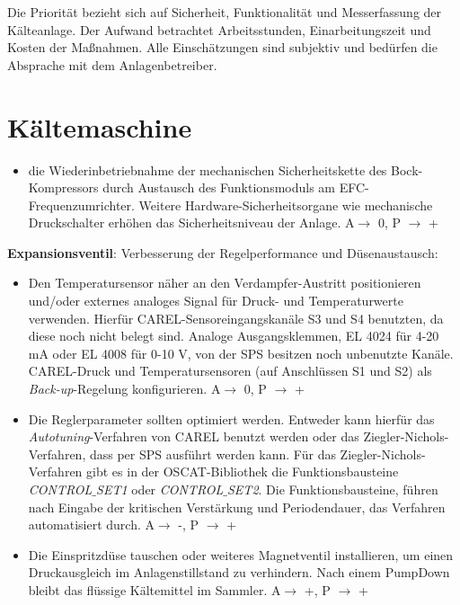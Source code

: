 Die Priorität bezieht sich auf Sicherheit, Funktionalität und Messerfassung der Kälteanlage. Der Aufwand betrachtet Arbeitsstunden, Einarbeitungszeit und Kosten der Maßnahmen. Alle Einschätzungen sind subjektiv und bedürfen die Absprache mit dem Anlagenbetreiber.

\section*{Kältemaschine}

\begin{itemize}
\item die Wiederinbetriebnahme der mechanischen Sicherheitskette des Bock-Kompressors durch Austausch des Funktionsmoduls am EFC-Frequenzumrichter. Weitere Hardware-Sicherheitsorgane wie mechanische Druckschalter erhöhen das Sicherheitsniveau der Anlage.  A$\rightarrow$ 0, P $\rightarrow$ +
\end{itemize}		
		
	\textbf{Expansionsventil}: Verbesserung der Regelperformance und Düsenaustausch:
	\begin{itemize}
	 \item Den Temperatursensor näher an den Verdampfer-Austritt positionieren und/oder externes analoges Signal für Druck- und Temperaturwerte  verwenden. Hierfür CAREL-Sensoreingangskanäle S3 und S4 benutzten, da diese noch nicht belegt sind. Analoge Ausgangsklemmen, EL 4024 für 4-20 mA oder EL 4008 für 0-10 V, von der SPS besitzen noch unbenutzte Kanäle. CAREL-Druck und Temperatursensoren (auf Anschlüssen S1 und S2) als \textit{Back-up}-Regelung konfigurieren. A$\rightarrow$ 0, P $\rightarrow$ +
	 
	 \item Die Reglerparameter sollten optimiert werden. Entweder kann hierfür das \textit{Autotuning}-Verfahren von CAREL benutzt werden oder das Ziegler-Nichols-Verfahren, dass per SPS ausführt werden kann. Für das Ziegler-Nichols-Verfahren gibt es in der OSCAT-Bibliothek die Funktionsbausteine \textit{CONTROL$\_$SET1} oder \textit{CONTROL$\_$SET2}. Die Funktionsbausteine, führen nach Eingabe der kritischen Verstärkung und Periodendauer, das Verfahren automatisiert durch. A$\rightarrow$ -, P $\rightarrow$ +
	 \item 	Die Einspritzdüse tauschen oder weiteres Magnetventil installieren, um einen Druckausgleich im Anlagenstillstand zu verhindern. Nach einem PumpDown bleibt das flüssige Kältemittel im Sammler. A$\rightarrow$ +, P $\rightarrow$ +
	\end{itemize}		
		



